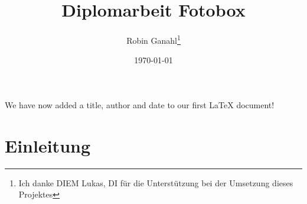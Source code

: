 \documentclass[12pt, a4paper]{article}
\title{Diplomarbeit Fotobox}
\author{Robin Ganahl\thanks{Ich danke DIEM Lukas, DI für die Unterstützung bei der Umsetzung dieses Projektes}}
\date{\today}
\begin{document}
\maketitle
We have now added a title, author and date to our first \LaTeX{} document!

\newpage
\tableofcontents
\newpage
\section{Einleitung}


\end{document}
